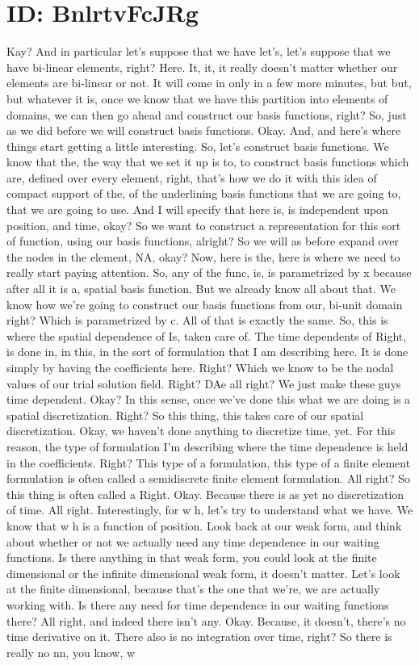 \documentclass[10pt]{article}
\begin{document}
\section*{ID: BnlrtvFcJRg}
Kay? And in particular let's suppose that we have let's, let's suppose that we have bi-linear elements, right? Here. It, it, it really doesn't matter whether our elements are bi-linear or not. It will come in only in a few more minutes, but but, but whatever it is, once we know that we have this partition into elements of domains, we can then go ahead and construct our basis functions, right? So, just as we did before we will construct basis functions. Okay. And, and here's where things start getting a little interesting. So, let's construct basis functions. We know that the, the way that we set it up is to, to construct basis functions which are, defined over every element, right, that's how we do it with this idea of compact support of the, of the underlining basis functions that we are going to, that we are going to use. And I will specify that here is, is independent upon position, and time, okay? So we want to construct a representation for this sort of function, using our basis functions, alright? So we will as before expand over the nodes in the element, NA, okay? Now, here is the, here is where we need to really start paying attention. So, any of the func, is, is parametrized by x because after all it is a, spatial basis function. But we already know all about that. We know how we're going to construct our basis functions from our, bi-unit domain right? Which is parametrized by c. All of that is exactly the same. So, this is where the spatial dependence of Is, taken care of. The time dependents of Right, is done in, in this, in the sort of formulation that I am describing here. It is done simply by having the coefficients here. Right? Which we know to be the nodal values of our trial solution field. Right? DAe all right? We just make these guys time dependent. Okay? In this sense, once we've done this what we are doing is a spatial discretization. Right? So this thing, this takes care of our spatial discretization. Okay, we haven't done anything to discretize time, yet. For this reason, the type of formulation I'm describing where the time dependence is held in the coefficients. Right? This type of a formulation, this type of a finite element formulation is often called a semidiscrete finite element formulation. All right? So this thing is often called a Right. Okay. Because there is as yet no discretization of time. All right. Interestingly, for w h, let's try to understand what we have. We know that w h is a function of position. Look back at our weak form, and think about whether or not we actually need any time dependence in our waiting functions. Is there anything in that weak form, you could look at the finite dimensional or the infinite dimensional weak form, it doesn't matter. Let's look at the finite dimensional, because that's the one that we're, we are actually working with. Is there any need for time dependence in our waiting functions there? All right, and indeed there isn't any. Okay. Because, it doesn't, there's no time derivative on it. There also is no integration over time, right? So there is really no nn, you know, w 
\end{document}

